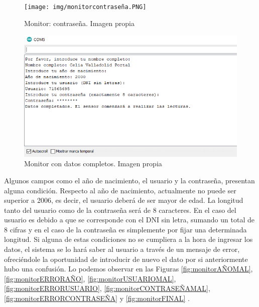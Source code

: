  \begin{figure}[H]
    \centering
    \texttt{[image: img/monitorcontraseña.PNG]}
    \caption{Monitor: contraseña. Imagen propia }
    \label{fig:monitorCONTRASEÑA}
\end{figure}

 \begin{figure}[H]
    \centering
    \includegraphics[width=1.1\textwidth]{img/monitorcompleto.PNG}
    \caption{Monitor con datos completos. Imagen propia }
    \label{fig:monitorCOMPLETO}
\end{figure}

Algunos campos como el año de nacimiento, el usuario y la contraseña, presentan alguna condición. Respecto al año de nacimiento, actualmente no puede ser superior a 2006, es decir, el usuario deberá de ser mayor de edad. La longitud tanto del usuario como de la contraseña será de 8 caracteres. En el caso del usuario es debido a que se corresponde con el DNI sin letra, sumando un total de 8 cifras y en el caso de la contraseña es simplemente por fijar una determinada longitud. Si alguna de estas condiciones no se cumpliera a la hora de ingresar los datos, el sistema se lo hará saber al usuario a través de un mensaje de error, ofreciéndole la oportunidad de introducir de nuevo el dato por si anteriormente hubo una confusión. Lo podemos observar en las Figuras \ref{fig:monitorAÑOMAL}, \ref{fig:monitorERRORAÑO}, \ref{fig:monitorUSUARIOMAL}, \ref{fig:monitorERRORUSUARIO}, \ref{fig:monitorCONTRASEÑAMAL}, \ref{fig:monitorERRORCONTRASEÑA} y \ref{fig:monitorFINAL} .

